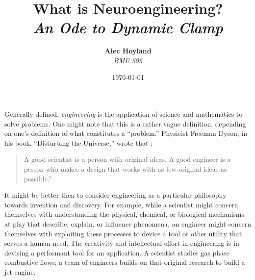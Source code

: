 \documentclass[11pt]{diazessay} %
\title{\textbf{What is Neuroengineering?} \\ {\Large\itshape An Ode to Dynamic Clamp}} %
\author{\textbf{Alec Hoyland} \\ \textit{BME 595}} %
\date{\today} %
\begin{document}
\maketitle %





\vspace{30pt} %


Generally defined, \textit{engineering} is the application of science and mathematics to solve problems.
One might note that this is a rather vague definition, depending on one's definition of what constitutes a ``problem.''
Physicist Freeman Dyson, in his book, ``Disturbing the Universe,''
wrote that \cite{dysonDisturbingUniverse1979}:

\begin{quote}
	A good scientist is a person with original ideas. A good engineer is a person who makes a design
	that works with as few original ideas as possible.''
\end{quote}

It might be better then to consider engineering as a particular philosophy towards invention and discovery.
For example, while a scientist might concern themselves with understanding the physical, chemical, or biological
mechanisms at play that describe, explain, or influence phenomena,
an engineer might concern themselves with exploiting these processes to device a tool or other utility
that serves a human need.
The creativity and intellectual effort in engineering is in devising a performant tool for an application.
A scientist studies gas phase combustive flows; a team of engineers builds on that original research
to build a jet engine.
\end{document}

